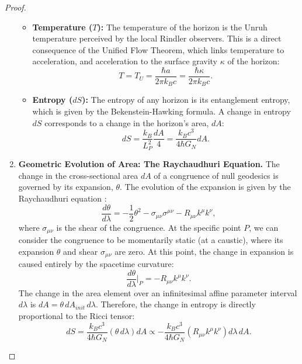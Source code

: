 \documentclass[11pt, letterpaper]{report}
\theoremstyle{plain} %
\theoremstyle{definition} %
\theoremstyle{remark} %
\begin{document}
\begin{proof}
\begin{enumerate}
\begin{itemize}
        \item \textbf{Temperature ($T$):} The temperature of the horizon is the Unruh temperature perceived by the local Rindler observers. This is a direct consequence of the Unified Flow Theorem, which links temperature to acceleration, and acceleration to the surface gravity $\kappa$ of the horizon:
        \begin{equation}
            T = T_U = \frac{\hbar a}{2\pi k_B c} = \frac{\hbar \kappa}{2\pi k_B c}.
        \end{equation}

        \item \textbf{Entropy ($dS$):} The entropy of any horizon is its entanglement entropy, which is given by the Bekenstein-Hawking formula. A change in entropy $dS$ corresponds to a change in the horizon's area, $dA$:
        \begin{equation}
            dS = \frac{k_B}{L_P^2} \frac{dA}{4} = \frac{k_B c^3}{4\hbar G_N} dA.
        \end{equation}
    \end{itemize}

    \item \textbf{Geometric Evolution of Area: The Raychaudhuri Equation.}
    The change in the cross-sectional area $dA$ of a congruence of null geodesics is governed by its expansion, $\theta$. The evolution of the expansion is given by the Raychaudhuri equation \cite{Raychaudhuri1955}:
    \begin{equation}
        \frac{d\theta}{d\lambda} = -\frac{1}{2}\theta^2 - \sigma_{\mu\nu}\sigma^{\mu\nu} - R_{\mu\nu}k^\mu k^\nu,
    \end{equation}
    where $\sigma_{\mu\nu}$ is the shear of the congruence. At the specific point $P$, we can consider the congruence to be momentarily static (at a caustic), where its expansion $\theta$ and shear $\sigma_{\mu\nu}$ are zero. At this point, the change in expansion is caused entirely by the spacetime curvature:
    $$ \frac{d\theta}{d\lambda} \bigg|_P = - R_{\mu\nu}k^\mu k^\nu. $$
    The change in the area element over an infinitesimal affine parameter interval $d\lambda$ is $dA = \theta \, dA_{init} \, d\lambda$. Therefore, the change in entropy is directly proportional to the Ricci tensor:
    \begin{equation}
        dS = \frac{k_B c^3}{4\hbar G_N} (\theta \, d\lambda) dA \propto - \frac{k_B c^3}{4\hbar G_N} (R_{\mu\nu}k^\mu k^\nu) d\lambda \, dA.
    \end{equation}


\end{enumerate}
\end{proof}
\end{document}
